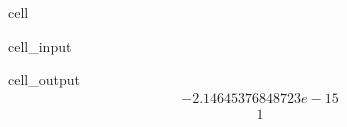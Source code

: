 \documentclass[letterpaper,10pt,english]{jupyterBook}
\begin{document}
\begin{sphinxuseclass}{cell}\begin{sphinxVerbatimInput}

\begin{sphinxuseclass}{cell_input}
\begin{sphinxVerbatim}[commandchars=\\\{\}]
\end{sphinxVerbatim}

\end{sphinxuseclass}\end{sphinxVerbatimInput}
\begin{sphinxVerbatimOutput}

\begin{sphinxuseclass}{cell_output}\begin{equation*}
\begin{split}-2.14645376848723e-15\end{split}
\end{equation*}\begin{equation*}
\begin{split}1\end{split}
\end{equation*}
\end{sphinxuseclass}\end{sphinxVerbatimOutput}

\end{sphinxuseclass}
\end{document}
